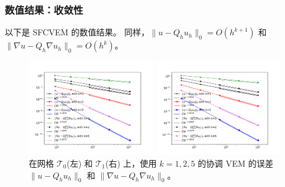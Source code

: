 \documentclass[notheorems,serif]{beamer}
\begin{document}
\begin{frame}
\frametitle{数值结果：收敛性}
以下是 SFCVEM 的数值结果。
同样，$\|u - Q_h u_h\|_0=O(h^{k+1})$ 和 $\|\nabla u - Q_{h}\nabla
u_h\|_0=O(h^{k})$。 

\begin{figure}[htbp]
\centering
\begin{minipage}[t]{0.49\linewidth}
\centering
\includegraphics[width=5.5cm]{../figures/stabfree/cvem_convex.pdf}
\end{minipage}%
\begin{minipage}[t]{0.49\linewidth}
\centering
\includegraphics[width=5.5cm]{../figures/stabfree/cvem_nonconvex.pdf}
\end{minipage}%
\centering
\caption{在网格 $\mathcal T_0$(左) 和 $\mathcal T_1$(右) 上，使用 $k=1, 2, 5$
的协调 VEM 的误差 $\|u - Q_h u_h\|_0$ 和 $\|\nabla u - Q_{h}\nabla u_h\|_0$。}
\label{fig:rate2}
\end{figure}
\end{frame}
\end{document}
